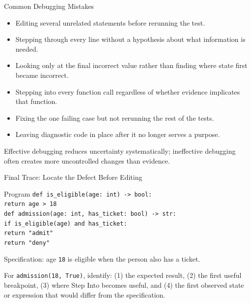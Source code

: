 \documentclass[aspectratio=169,10pt]{beamer}
\begin{document}
\begin{frame}{Common Debugging Mistakes}
  \begin{itemize}
    \item Editing several unrelated statements before rerunning the test.
    \item Stepping through every line without a hypothesis about what information is needed.
    \item Looking only at the final incorrect value rather than finding where state first became incorrect.
    \item Stepping into every function call regardless of whether evidence implicates that function.
    \item Fixing the one failing case but not rerunning the rest of the tests.
    \item Leaving diagnostic code in place after it no longer serves a purpose.
  \end{itemize}

  \begin{keyidea}
    Effective debugging reduces uncertainty systematically; ineffective debugging often creates more uncontrolled changes than evidence.
  \end{keyidea}
\end{frame}

\begin{frame}[shrink=6]{Final Trace: Locate the Defect Before Editing}
  \begin{block}{Program}
    \texttt{def is\_eligible(age: int) -> bool:}\\
    \hspace*{0.20in}\texttt{return age > 18}\\[0.06in]
    \texttt{def admission(age: int, has\_ticket: bool) -> str:}\\
    \hspace*{0.20in}\texttt{if is\_eligible(age) and has\_ticket:}\\
    \hspace*{0.40in}\texttt{return "admit"}\\
    \hspace*{0.20in}\texttt{return "deny"}
  \end{block}

  Specification: age \texttt{18} is eligible when the person also has a ticket.

  \begin{activity}
    For \texttt{admission(18, True)}, identify: (1) the expected result, (2) the first useful breakpoint, (3) where Step Into becomes useful, and (4) the first observed state or expression that would differ from the specification.
  \end{activity}
\end{frame}
\end{document}
